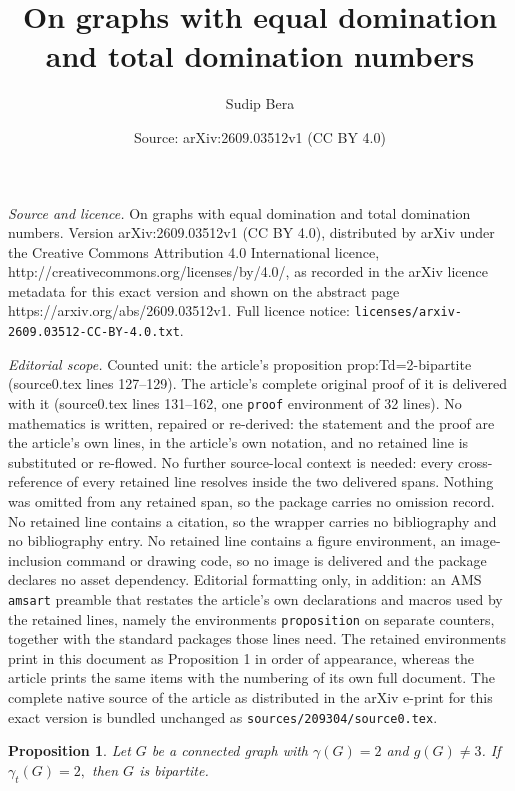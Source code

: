 \documentclass[10pt,a4paper]{amsart}
\title{On graphs with equal domination and total domination numbers}
\author{Sudip Bera}
\date{Source: arXiv:2609.03512v1 (CC BY 4.0)}
\newtheorem{proposition}{Proposition}
\begin{document}
\maketitle

\noindent\emph{Source and licence.} On graphs with equal domination and total domination numbers. Version arXiv:2609.03512v1 (CC BY 4.0), distributed by arXiv under the Creative Commons Attribution 4.0 International licence, http://creativecommons.org/licenses/by/4.0/, as recorded in the arXiv licence metadata for this exact version and shown on the abstract page https://arxiv.org/abs/2609.03512v1. Full licence notice: \texttt{licenses/arxiv-2609.03512-CC-BY-4.0.txt}.\par\smallskip

\noindent\textit{Editorial scope.} Counted unit: the article's proposition prop:Td=2-bipartite (source0.tex lines 127--129). The article's complete original proof of it is delivered with it (source0.tex lines 131--162, one \texttt{proof} environment of 32 lines). No mathematics is written, repaired or re-derived: the statement and the proof are the article's own lines, in the article's own notation, and no retained line is substituted or re-flowed.  No further source-local context is needed: every cross-reference of every retained line resolves inside the two delivered spans.  Nothing was omitted from any retained span, so the package carries no omission record.  No retained line contains a citation, so the wrapper carries no bibliography and no bibliography entry.  No retained line contains a figure environment, an image-inclusion command or drawing code, so no image is delivered and the package declares no asset dependency.  Editorial formatting only, in addition: an AMS \texttt{amsart} preamble that restates the article's own declarations and macros used by the retained lines, namely the environments \texttt{proposition} on separate counters, together with the standard packages those lines need.  The retained environments print in this document as Proposition 1 in order of appearance, whereas the article prints the same items with the numbering of its own full document.  The complete native source of the article as distributed in the arXiv e-print for this exact version is bundled unchanged as \texttt{sources/209304/source0.tex}.
\begin{proposition}\label{prop:Td=2-bipartite}
Let $G$ be a connected graph with $\gamma(G)=2$ and $g(G)\neq 3$. If $\gamma_t(G)=2,$ then $G$ is bipartite.
\end{proposition}
\end{document}
